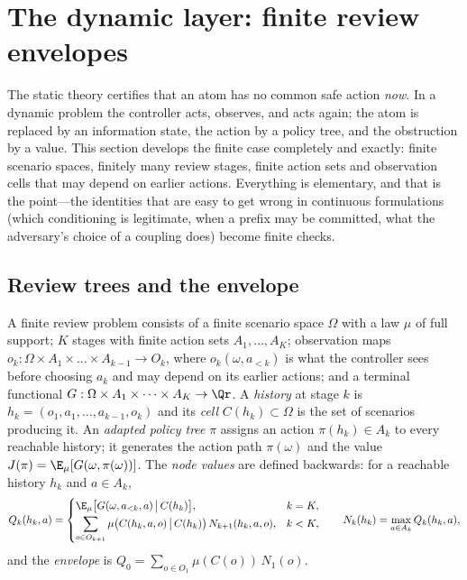 \section{The dynamic layer: finite review envelopes}\label{sec:dynamic}

The static theory certifies that an atom has no common safe action \emph{now}. In a dynamic problem the controller acts, observes, and acts again; the atom is replaced by an information state, the action by a policy tree, and the obstruction by a value. This section develops the finite case completely and exactly: finite scenario spaces, finitely many review stages, finite action sets and observation cells that may depend on earlier actions. Everything is elementary, and that is the point---the identities that are easy to get wrong in continuous formulations (which conditioning is legitimate, when a prefix may be committed, what the adversary's choice of a coupling does) become finite checks.

\subsection{Review trees and the envelope}

\begin{definition}\label{def:tree}
A finite review problem consists of a finite scenario space $\Omega$ with a law $\mu$ of full support; $K$ stages with finite action sets $A_1,\dots,A_K$; observation maps $o_k:\Omega\times A_1\times\dots\times A_{k-1}\to O_k$, where $o_k(\omega,a_{<k})$ is what the controller sees before choosing $a_k$ and may depend on its earlier actions; and a terminal functional $G:\Omega\times A_1\times\dots\times A_K\to\Qr$. A \emph{history} at stage $k$ is $h_k=(o_1,a_1,\dots,a_{k-1},o_k)$ and its \emph{cell} $C(h_k)\subset\Omega$ is the set of scenarios producing it. An \emph{adapted policy tree} $\pi$ assigns an action $\pi(h_k)\in A_k$ to every reachable history; it generates the action path $\pi(\omega)$ and the value $J(\pi)=\E_\mu[G(\omega,\pi(\omega))]$. The \emph{node values} are defined backwards: for a reachable history $h_k$ and $a\in A_k$,
\begin{equation}\label{eq:N}
Q_k(h_k,a)=\begin{cases}\E_\mu\bigl[G(\omega,a_{<k},a)\,\big|\,C(h_k)\bigr], & k=K,\\[2pt]
\displaystyle\sum_{o\in O_{k+1}}\mu\bigl(C(h_k,a,o)\,\big|\,C(h_k)\bigr)\,N_{k+1}(h_k,a,o), & k<K,\end{cases}\qquad
N_k(h_k)=\max_{a\in A_k}Q_k(h_k,a),
\end{equation}
and the \emph{envelope} is $Q_0=\sum_{o\in O_1}\mu(C(o))\,N_1(o)$.
\end{definition}

